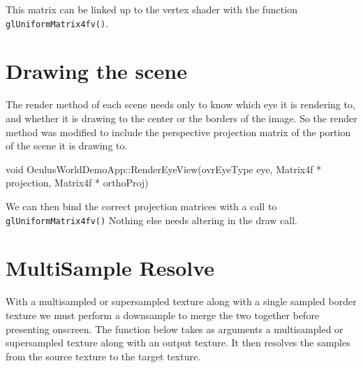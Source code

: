 \documentclass[12pt,a4paper,twoside,openright]{report}
\begin{document}
This matrix can be linked up to the vertex shader with the function \texttt{glUniformMatrix4fv()}.

\section{Drawing the scene}

The render method of each scene needs only to know which eye it is rendering to, and whether it is drawing to the center or the borders of the image. 
So the render method was modified to include the perspective projection matrix of the portion of the scene it is drawing to.

\begin{blockcode}[commandchars=\\\{\}]
void OculusWorldDemoApp::RenderEyeView(ovrEyeType eye,
                                       \color{green}Matrix4f * projection,
                                       \color{green}Matrix4f * orthoProj)
\end{blockcode}

We can then bind the correct projection matrices with a call to \texttt{glUniformMatrix4fv()}
Nothing else needs altering in the draw call.

\section{MultiSample Resolve}

With a multisampled or supersampled texture along with a single sampled border texture we must perform a downsample to merge the two together before presenting onscreen. 
The function below takes as arguments a multisampled or supersampled texture along with an output texture. It then resolves the samples from the source texture to the target texture.
\end{document}
